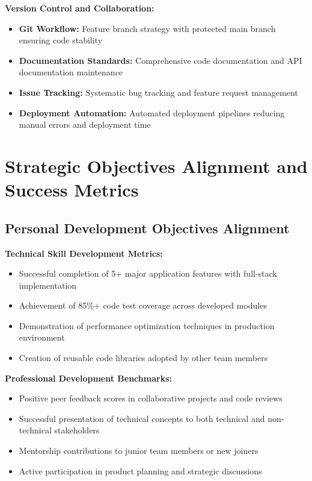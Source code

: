 \textbf{Version Control and Collaboration:}
\begin{itemize}
    \item \textbf{Git Workflow:} Feature branch strategy with protected main branch ensuring code stability
    \item \textbf{Documentation Standards:} Comprehensive code documentation and API documentation maintenance
    \item \textbf{Issue Tracking:} Systematic bug tracking and feature request management
    \item \textbf{Deployment Automation:} Automated deployment pipelines reducing manual errors and deployment time
\end{itemize}

\section{Strategic Objectives Alignment and Success Metrics}

\subsection{Personal Development Objectives Alignment}

\textbf{Technical Skill Development Metrics:}
\begin{itemize}
    \item Successful completion of 5+ major application features with full-stack implementation
    \item Achievement of 85\%+ code test coverage across developed modules
    \item Demonstration of performance optimization techniques in production environment
    \item Creation of reusable code libraries adopted by other team members
\end{itemize}

\textbf{Professional Development Benchmarks:}
\begin{itemize}
    \item Positive peer feedback scores in collaborative projects and code reviews
    \item Successful presentation of technical concepts to both technical and non-technical stakeholders
    \item Mentorship contributions to junior team members or new joiners
    \item Active participation in product planning and strategic discussions
\end{itemize}

